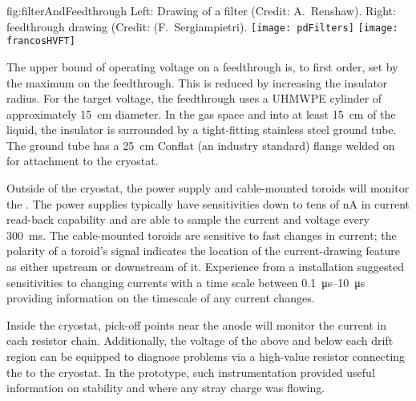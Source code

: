 \begin{dunefigure}{fig:filterAndFeedthrough}
{Left:  Drawing of a  filter (Credit:  A.~Renshaw). Right:   feedthrough drawing (Credit:  (F.~Sergiampietri).}
\texttt{[image: pdFilters]}
\texttt{[image: francosHVFT]}
\end{dunefigure}

The upper bound of operating voltage on a feedthrough is, to first order, set by the maximum \efield{} on the feedthrough.  This \efield{} is reduced by increasing the insulator radius.  For the target voltage, the feedthrough uses a UHMWPE cylinder of approximately \SI{15}{cm} diameter.  In the gas space and into at least \SI{15}{\centi\meter} of the liquid, the insulator is surrounded by a tight-fitting stainless steel ground tube.  The ground tube has a \SI{25}{\centi\meter}  Conflat (an industry standard) flange  welded on for attachment to the cryostat.


Outside of the cryostat, the  power supply and cable-mounted toroids will monitor the .    The power supplies %
typically have sensitivities down to tens of \si{\nano\ampere} in current read-back capability 
 and are able to sample the current and voltage every \SI{300}{\ms}.  The cable-mounted toroids are sensitive to fast changes in current; %
the polarity of a toroid's signal %
indicates the location of the current-drawing feature as either upstream or downstream of it.  Experience from a  installation suggested sensitivities to changing currents with a time scale between \SIrange{0.1}{10}{\micro\s} providing information on the timescale of any current changes.

Inside the cryostat, pick-off points near the anode will monitor the current %
in each resistor chain.  Additionally, the voltage of the  above and below each drift region can be equipped to diagnose problems via a high-value resistor connecting the  to the cryostat.  In the  prototype, such instrumentation provided useful information on  stability and where any stray charge was flowing.

